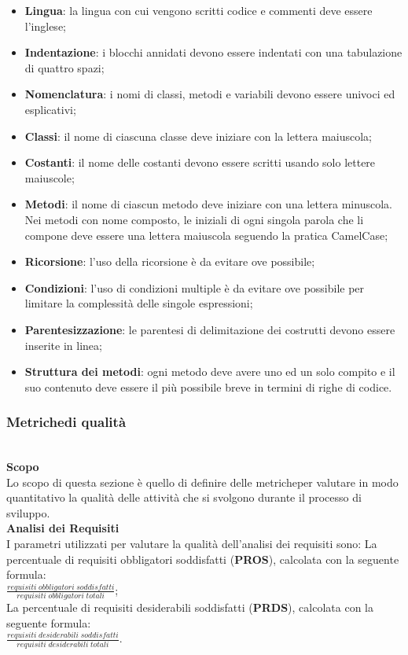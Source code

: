 \begin{itemize}
	\item \textbf{Lingua}: la lingua con cui vengono scritti codice e commenti deve essere l'inglese;
	\item \textbf{Indentazione}: i blocchi annidati devono essere indentati con una tabulazione di quattro spazi;
	\item \textbf{Nomenclatura}: i nomi di classi, metodi e variabili devono essere univoci ed esplicativi;
	\item \textbf{Classi}: il nome di ciascuna classe deve iniziare con la lettera maiuscola; 
	\item \textbf{Costanti}: il nome delle costanti devono essere scritti usando solo lettere maiuscole;
	\item \textbf{Metodi}: il nome di ciascun metodo deve iniziare con una lettera minuscola. Nei metodi con nome composto, le iniziali di ogni singola parola che li compone deve essere una lettera maiuscola seguendo la pratica CamelCase;
	\item \textbf{Ricorsione}: l'uso della ricorsione è da evitare ove possibile;
	\item \textbf{Condizioni}: l'uso di condizioni multiple è da evitare ove possibile per limitare la complessità delle singole espressioni;
	\item \textbf{Parentesizzazione}: le parentesi di delimitazione dei costrutti devono essere inserite in linea;
	\item \textbf{Struttura dei metodi}: ogni metodo deve avere uno ed un solo compito e il suo contenuto deve essere il più possibile breve in termini di righe di codice.
\end{itemize}
\subsubsection{Metriche\glosp di qualità}\mbox{}\\ [1mm]
\textbf{Scopo}\\
Lo scopo di questa sezione è quello di definire delle metriche\glosp per valutare in modo quantitativo la qualità delle attività che si svolgono durante il processo di sviluppo.
\\\textbf{Analisi dei Requisiti}\\
I parametri utilizzati per valutare la qualità dell'analisi dei requisiti sono:
La percentuale di requisiti obbligatori soddisfatti (\textbf{PROS}), calcolata con la seguente formula: \\
	$\frac{requisiti \; obbligatori \; soddisfatti}{requisiti \; obbligatori \; totali}$; \\
La percentuale di requisiti desiderabili soddisfatti (\textbf{PRDS}), calcolata con la seguente formula: \\
	$\frac{requisiti \; desiderabili \; soddisfatti}{requisiti \; desiderabili \; totali}$.
